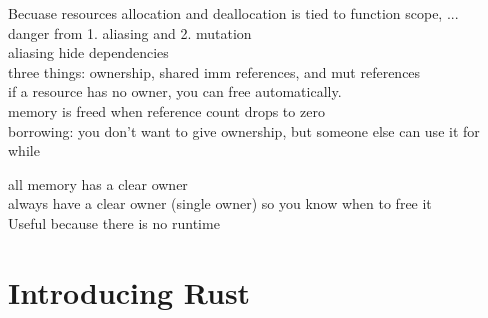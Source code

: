 Becuase resources allocation and deallocation is tied to function scope, ... \\

danger from 1. aliasing and 2. mutation \\

aliasing hide dependencies \\

three things: ownership, shared imm references, and mut references \\

if a resource has no owner, you can free automatically. \\
memory is freed when reference count drops to zero \\

borrowing: you don't want to give ownership, but someone else can use it for \\
while

all memory has a clear owner \\

always have a clear owner (single owner) so you know when to free it \\

Useful because there is no runtime \\

\section{Introducing Rust}

